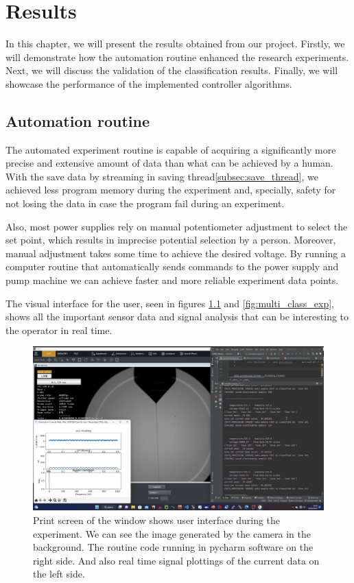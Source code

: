 \chapter{Results}
\label{chap:Results}

In this chapter, we will present the results obtained from our project. 
Firstly, we will demonstrate how the automation routine enhanced the research experiments. 
Next, we will discuss the validation of the classification results. 
Finally, we will showcase the performance of the implemented controller algorithms.

\section{Automation routine}
\label{sec:automation_routine}

The automated experiment routine is capable of acquiring a significantly more precise and extensive amount of data than what can be achieved by a human. 
With the save data by streaming in saving thread\ref{subsec:save_thread}, we achieved less program memory during the experiment and, specially, safety for not losing the data in case the program fail during an experiment.

Also, most power supplies rely on manual potentiometer adjustment to select the set point, which results in imprecise potential selection by a person. 
Moreover, manual adjustment takes some time to achieve the desired voltage. 
By running a computer routine that automatically sends commands to the power supply and pump machine we can achieve faster and more reliable experiment data points.

The visual interface for the user, seen in figures \ref{fig:multi_class_exp1} and \ref{fig:multi_class_exp}, shows all the important sensor data and signal analysis that can be interesting to the operator in real time.

\begin{figure}[H]
    \center
    \includegraphics[width=16cm]{Figuras/19:03/axs1.png}
    \caption{Print screen of the window shows user interface during the experiment.
        We can see the image generated by the camera in the background.
        The routine code running in pycharm software on the right side.
        And also real time signal plottings of the current data on the left side.}
        \label{fig:multi_class_exp1}
\end{figure}


